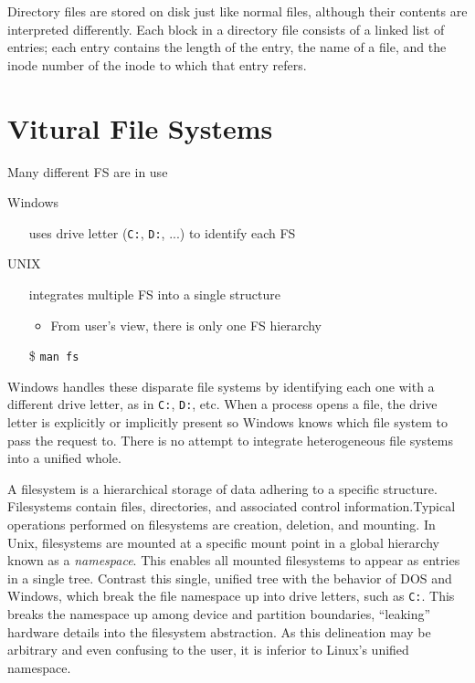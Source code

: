 Directory files are stored on disk just like normal files, although their contents are
interpreted differently. Each block in a directory file consists of a linked list of
entries; each entry contains the length of the entry, the name of a file, and the inode
number of the inode to which that entry refers.

\section{Vitural File Systems}

\begin{frame}{Many different FS are in use}
  \begin{block}{Windows}
    \begin{itemize}
    \item[] uses drive letter (\texttt{C:}, \texttt{D:}, ...) to identify each FS
    \end{itemize}
  \end{block}
  \begin{block}{UNIX}
    \begin{itemize}
    \item[] integrates multiple FS into a single structure
      \begin{itemize}
      \item From user's view, there is only one FS hierarchy
      \end{itemize}
    \end{itemize}
  \end{block}
  \begin{itemize}
    \item[\$] \texttt{man fs}
  \end{itemize}
\end{frame}

Windows handles these disparate file systems by identifying each one with a different
drive letter, as in \texttt{C:}, \texttt{D:}, etc. When a process opens a file, the drive
letter is explicitly or implicitly present so Windows knows which file system to pass the
request to. There is no attempt to integrate heterogeneous file systems into a unified
whole.

A filesystem is a hierarchical storage of data adhering to a specific
structure. Filesystems contain files, directories, and associated control
information.Typical operations performed on filesystems are creation, deletion, and
mounting. In Unix, filesystems are mounted at a specific mount point in a global hierarchy
known as a \emph{namespace}. This enables all mounted filesystems to appear as entries in
a single tree. Contrast this single, unified tree with the behavior of DOS and Windows,
which break the file namespace up into drive letters, such as \texttt{C:}. This breaks the
namespace up among device and partition boundaries, ``leaking'' hardware details into the
filesystem abstraction. As this delineation may be arbitrary and even confusing to the
user, it is inferior to Linux's unified namespace.

